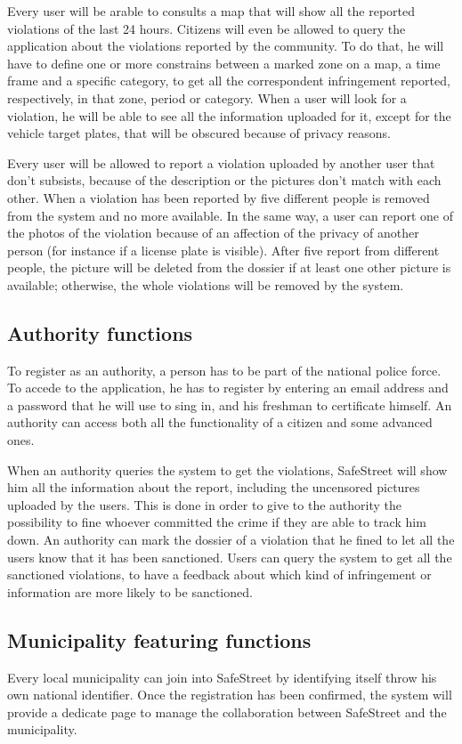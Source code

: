 \documentclass[a4paper, hidelinks, 12pt]{report}
\begin{document}
    Every user will be arable to consults a map that will show all the reported violations of the last 24 hours. Citizens will even be allowed to query the application about the violations reported by the community. To do that, he will have to define one or more constrains between a marked zone on a map, a time frame and a specific category, to get all the correspondent infringement reported, respectively, in that zone, period or category. When a user will look for a violation, he will be able to see all the information uploaded for it, except for the vehicle target plates, that will be obscured because of privacy reasons.

    Every user will be allowed to report a violation uploaded by another user that don’t subsists, because of the description or the pictures don’t match with each other. When a violation has been reported by five different people is removed from the system and no more available. In the same way, a user can report one of the photos of the violation because of an affection of the privacy of another person (for instance if a license plate is visible). After five report from different people, the picture will be deleted from the dossier if at least one other picture is available; otherwise, the whole violations will be removed by the system.
    \subsection{Authority functions}\label{subsec:authority-functions}
    To register as an authority, a person has to be part of the national police force. To accede to the application, he has to register by entering an email address and a password that he will use to sing in, and his freshman to certificate himself. An authority can access both all the functionality of a citizen and some advanced ones.

    When an authority queries the system to get the violations, SafeStreet will show him all the information about the report, including the uncensored pictures uploaded by the users. This is done in order to give to the authority the possibility to fine whoever committed the crime if they are able to track him down. An authority can mark the dossier of a violation that he fined to let all the users know that it has been sanctioned. Users can query the system to get all the sanctioned violations, to have a feedback about which kind of infringement or information are more likely to be sanctioned.
    \subsection{Municipality featuring functions}\label{subsec:municipality-featuring-functions}
    Every local municipality can join into SafeStreet by identifying itself throw his own national identifier. Once the registration has been confirmed, the system will provide a dedicate page to manage the collaboration between SafeStreet and the municipality.
\end{document}
